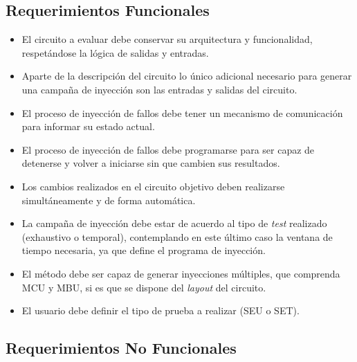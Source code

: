 \documentclass[a4paper,openright,12pt]{report}
\begin{document}


\subsection{ Requerimientos Funcionales}

\begin{itemize}
\item El circuito a evaluar debe conservar su arquitectura y funcionalidad, respetándose la lógica de  salidas y entradas.
\item Aparte de la descripción del circuito lo único adicional necesario para generar una campaña de inyección son las entradas y salidas del circuito.
\item El proceso de inyección de fallos debe  tener un mecanismo de comunicación para informar  su estado actual.
\item El proceso de inyección de fallos debe programarse para ser capaz de  detenerse y volver a iniciarse sin que cambien sus resultados.
\item Los cambios realizados en el circuito  objetivo deben realizarse simultáneamente  y de forma automática.
\item  La campaña de inyección  debe  estar de acuerdo al tipo de \textit{test} realizado (exhaustivo o temporal), contemplando en este último  caso la ventana de tiempo necesaria, ya que define el programa de  inyección.

\item  El método debe ser capaz de generar inyecciones múltiples, que comprenda MCU y MBU, si es que se dispone del \textit{layout} del circuito.
\item  El usuario debe definir el tipo de prueba a realizar (SEU o SET).
\end{itemize}


\subsection{ Requerimientos No Funcionales}
\end{document}
